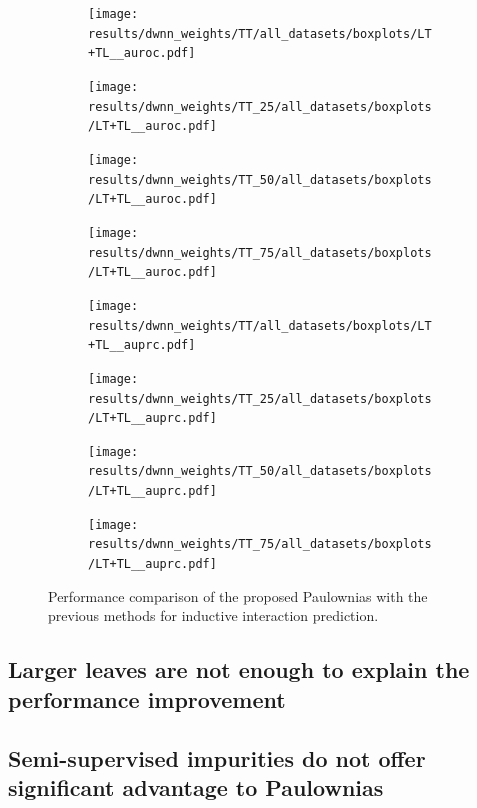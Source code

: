 \documentclass{article}
\begin{document}
\begin{figure}
    \centering
    \begin{subfigure}{.24\textwidth}
        \texttt{[image: results/dwnn\_weights/TT/all\_datasets/boxplots/LT+TL\_\_auroc.pdf]}
    \end{subfigure}
    \begin{subfigure}{.24\textwidth}
        \texttt{[image: results/dwnn\_weights/TT\_25/all\_datasets/boxplots/LT+TL\_\_auroc.pdf]}
    \end{subfigure}
    \begin{subfigure}{.24\textwidth}
        \texttt{[image: results/dwnn\_weights/TT\_50/all\_datasets/boxplots/LT+TL\_\_auroc.pdf]}
    \end{subfigure}
    \begin{subfigure}{.24\textwidth}
        \texttt{[image: results/dwnn\_weights/TT\_75/all\_datasets/boxplots/LT+TL\_\_auroc.pdf]}
    \end{subfigure}

     \begin{subfigure}{.24\textwidth}
        \texttt{[image: results/dwnn\_weights/TT/all\_datasets/boxplots/LT+TL\_\_auprc.pdf]}
    \end{subfigure}
    \begin{subfigure}{.24\textwidth}
        \texttt{[image: results/dwnn\_weights/TT\_25/all\_datasets/boxplots/LT+TL\_\_auprc.pdf]}
    \end{subfigure}
    \begin{subfigure}{.24\textwidth}
        \texttt{[image: results/dwnn\_weights/TT\_50/all\_datasets/boxplots/LT+TL\_\_auprc.pdf]}
    \end{subfigure}
    \begin{subfigure}{.24\textwidth}
        \texttt{[image: results/dwnn\_weights/TT\_75/all\_datasets/boxplots/LT+TL\_\_auprc.pdf]}
    \end{subfigure}   
    \caption{Performance comparison of the proposed Paulownias with the previous methods for inductive interaction prediction.}
    \label{fig:weights_LTTL}
\end{figure}

\subsection{Larger leaves are not enough to explain the performance improvement}

\subsection{Semi-supervised impurities do not offer significant advantage to Paulownias}
\end{document}
